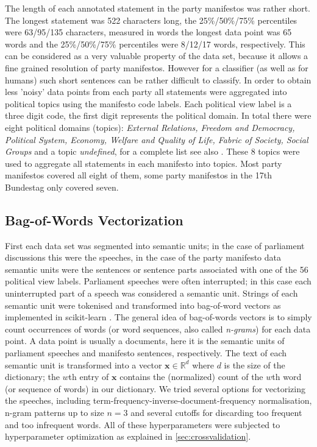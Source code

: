 \documentclass[runningheads,a4paper]{llncs}
\renewcommand{\vec}[1]{\mathbf{#1}}
\begin{document}
The length of each annotated statement in the party manifestos was rather short. The longest statement was 522 characters long, the 25\%/50\%/75\% percentiles were 63/95/135 characters, measured in words the longest data point was 65 words and the 25\%/50\%/75\% percentiles were 8/12/17 words, respectively. This can be considered as a very valuable property of the data set, because it allows a fine grained resolution of party manifestos. However for a classifier (as well as for humans) such short sentences can be rather difficult to classify. In order to obtain less 'noisy' data points from each party all statements were aggregated into political topics using the manifesto code labels. Each political view label is a three digit code, the first digit represents the political domain. In total there were eight political domains (topics): {\em External Relations, Freedom and Democracy, Political System, Economy, Welfare and Quality of Life, Fabric of Society, Social Groups} and a topic {\em undefined}, for a complete list see also \cite{leftright}. These 8 topics were used to aggregate all statements in each manifesto into topics. Most party manifestos covered all eight of them, some party manifestos in the 17th Bundestag only covered seven. 

\subsection{Bag-of-Words Vectorization}\label{sec:bow-vectorization}
First each data set was segmented into semantic units; in the case of parliament discussions this were the speeches, in the case of the party manifesto data semantic units were the sentences or sentence parts associated with one of the 56 political view labels.  Parliament speeches were often interrupted; in this case each uninterrupted part of a speech was considered a semantic unit. Strings of each semantic unit were tokenised and transformed into bag-of-word vectors as implemented in scikit-learn \cite{scikit-learn}. The general idea of bag-of-words vectors is to simply count occurrences of words (or word sequences, also called {\em n-grams}) for each data point. A data point is usually a documents, here it is the semantic units of parliament speeches and manifesto sentences, respectively. The text of each semantic unit is transformed into a vector $\vec{x}\in\mathds{R}^d$ where $d$ is the size of the dictionary; the $w$th entry of $\vec{x}$ contains the (normalized) count of the $w$th word (or sequence of words) in our dictionary. We tried several options for vectorizing the speeches, including term-frequency-inverse-document-frequency normalisation, n-gram patterns up to size $n=3$ and several cutoffs for discarding too frequent and too infrequent words. All of these hyperparameters were subjected to hyperparameter optimization as explained in \autoref{sec:crossvalidation}. 
\end{document}
